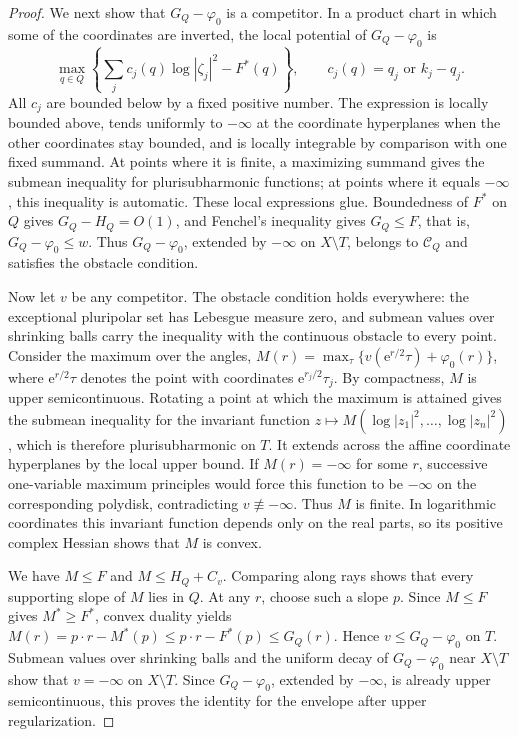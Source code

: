 \begin{proof}
We next show that $G_Q-\varphi_0$ is a competitor. In a product chart in which some of the coordinates are inverted, the local potential of $G_Q-\varphi_0$ is
\[
 \max_{q\in Q}\left\{\sum_j c_j(q)\log|\zeta_j|^2-F^*(q)\right\},
 \qquad c_j(q)=q_j\text{ or }k_j-q_j.
\]
All $c_j$ are bounded below by a fixed positive number. The expression
is locally bounded above, tends uniformly to $-\infty$ at the coordinate
hyperplanes when the other coordinates stay bounded, and is locally
integrable by comparison with one fixed summand. At points where it is finite, a maximizing summand gives the submean inequality for plurisubharmonic functions; at points where it equals $-\infty$, this inequality is automatic. These local expressions glue. Boundedness of $F^*$ on $Q$
gives $G_Q-H_Q=O(1)$, and Fenchel's inequality gives $G_Q\leq F$, that is, $G_Q-\varphi_0\leq w$.
Thus $G_Q-\varphi_0$, extended by $-\infty$ on $X\setminus T$, belongs to $\mathcal C_Q$ and satisfies the obstacle condition.

Now let $v$ be any competitor. The obstacle condition holds everywhere: the exceptional pluripolar set has Lebesgue measure zero, and submean values over shrinking balls carry the inequality with the continuous obstacle to every point. Consider the maximum over the angles,
$M(r)=\max_\tau\{v(\mathrm e^{r/2}\tau)+\varphi_0(r)\}$, where $\mathrm e^{r/2}\tau$ denotes the point with coordinates $\mathrm e^{r_j/2}\tau_j$.
By compactness, $M$ is upper semicontinuous. Rotating a point at which the maximum is attained gives the submean inequality for the invariant function $z\mapsto M(\log|z_1|^2,\ldots,\log|z_n|^2)$, which is therefore plurisubharmonic on $T$. It extends across the affine coordinate hyperplanes by the local upper bound. If $M(r)=-\infty$ for some $r$, successive one-variable maximum principles would force this function to be $-\infty$ on the corresponding polydisk, contradicting $v\not\equiv-\infty$. Thus $M$ is finite. In logarithmic coordinates this invariant function depends only on the real parts, so its positive complex Hessian shows that $M$ is convex.

We have $M\leq F$ and $M\leq H_Q+C_v$. Comparing along rays shows that every supporting slope of $M$ lies in $Q$. At any $r$, choose such a slope
$p$. Since $M\leq F$ gives $M^*\geq F^*$, convex duality yields
$M(r)=p\cdot r-M^*(p)\leq p\cdot r-F^*(p)\leq G_Q(r)$.
Hence $v\leq G_Q-\varphi_0$ on $T$. Submean values over shrinking balls and the uniform decay of $G_Q-\varphi_0$ near $X\setminus T$ show that $v=-\infty$ on $X\setminus T$. Since $G_Q-\varphi_0$, extended by $-\infty$, is already upper semicontinuous, this proves the identity for the envelope after upper regularization.
\end{proof}

